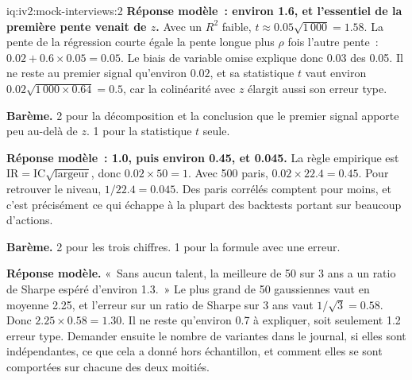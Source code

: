\begin{solution}{iq:iv2:mock-interviews:2}
\ivstop
\textbf{Réponse modèle~: environ 1.6, et l'essentiel de la première pente venait de $z$.} Avec un $R^2$ faible, $t \approx 0.05\sqrt{1\,000} = 1.58$. La pente de la régression courte égale la pente longue plus $\rho$ fois l'autre pente~: $0.02 + 0.6 \times 0.05 = 0.05$. Le biais de variable omise explique donc 0.03 des 0.05. Il ne reste au premier signal qu'environ $0.02$, et sa statistique $t$ vaut environ $0.02\sqrt{1\,000 \times 0.64} = 0.5$, car la colinéarité avec $z$ élargit aussi son erreur type.

\textbf{Barème.} 2 pour la décomposition et la conclusion que le premier signal apporte peu au-delà de $z$. 1 pour la statistique $t$ seule.

\ivstop
\textbf{Réponse modèle~: 1.0, puis environ 0.45, et 0.045.} La règle empirique est $\text{IR} = \text{IC}\sqrt{\text{largeur}}$, donc $0.02 \times 50 = 1$. Avec 500 paris, $0.02 \times 22.4 = 0.45$. Pour retrouver le niveau, $1/22.4 = 0.045$. Des paris corrélés comptent pour moins, et c'est précisément ce qui échappe à la plupart des backtests portant sur beaucoup d'actions.

\textbf{Barème.} 2 pour les trois chiffres. 1 pour la formule avec une erreur.

\ivstop
\textbf{Réponse modèle.} «~Sans aucun talent, la meilleure de 50 sur 3 ans a un ratio de Sharpe espéré d'environ 1.3.~» Le plus grand de 50 gaussiennes vaut en moyenne 2.25, et l'erreur sur un ratio de Sharpe sur 3 ans vaut $1/\sqrt{3} = 0.58$. Donc $2.25 \times 0.58 = 1.30$. Il ne reste qu'environ 0.7 à expliquer, soit seulement 1.2 erreur type. Demander ensuite le nombre de variantes dans le journal, si elles sont indépendantes, ce que cela a donné hors échantillon, et comment elles se sont comportées sur chacune des deux moitiés.


\end{solution}
